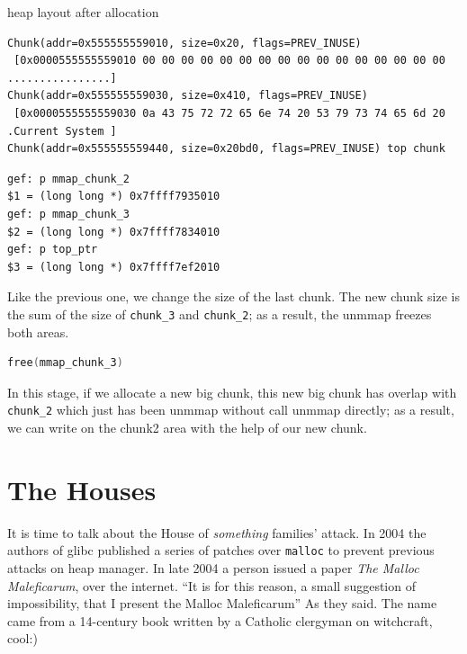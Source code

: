 \documentclass{masterthesis}
\newcommand*\libc{glibc}
\newcommand*\mallocc{\lstinline{malloc}\xspace}
\begin{document}
heap layout after allocation

\begin{lstlisting}[frame=tlrb]
Chunk(addr=0x555555559010, size=0x20, flags=PREV_INUSE)
 [0x0000555555559010 00 00 00 00 00 00 00 00 00 00 00 00 00 00 00 00 ................]
Chunk(addr=0x555555559030, size=0x410, flags=PREV_INUSE)
 [0x0000555555559030 0a 43 75 72 72 65 6e 74 20 53 79 73 74 65 6d 20 .Current System ]
Chunk(addr=0x555555559440, size=0x20bd0, flags=PREV_INUSE) top chunk
 \end{lstlisting}

\begin{lstlisting}[frame=tlrb]
gef: p mmap_chunk_2
$1 = (long long *) 0x7ffff7935010
gef: p mmap_chunk_3
$2 = (long long *) 0x7ffff7834010
gef: p top_ptr
$3 = (long long *) 0x7ffff7ef2010
 \end{lstlisting}

Like the previous one, we change the size of the last chunk. The new chunk size is the sum of the size of \lstinline{chunk_3} and \lstinline{chunk_2}; as a result, the unmmap freezes both areas.

\begin{lstlisting}[language=c,frame=tlrb]
free(mmap_chunk_3)
 \end{lstlisting}

In this stage, if we allocate a new big chunk, this new big chunk has overlap with \lstinline{chunk_2} which just has been unmmap without call unmmap directly; as a result, we can write on the chunk2 area with the help of our new chunk.

\section{The Houses}
\label{sect:thehouses}
It is time to talk about the House of \emph{something} families' attack. In 2004 the authors of \libc{} published a series of patches over \mallocc{} to prevent previous attacks on heap manager. In late 2004 a person issued a paper \emph{The Malloc Maleficarum}, over the internet. ``It is for this reason, a small suggestion of impossibility, that I present the Malloc Maleficarum'' As they said. The name came from a 14-century book written by a Catholic clergyman on witchcraft, cool:)
\end{document}
